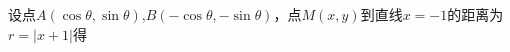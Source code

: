 设点$A\left( {\cos \theta ,\sin \theta } \right)$,$B\left( { - \cos \theta , - \sin \theta } \right)$，点$M\left( {x,y} \right)$到直线$x =  - 1$的距离为$r = \left| {x + 1} \right|$得